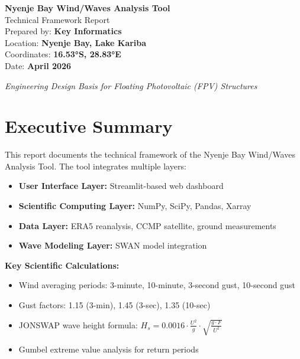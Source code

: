 \documentclass[12pt]{article}
\begin{document}
\begin{titlepage}
    \centering
    \vspace*{2cm}
    
    {\huge\bfseries\color{primary} Nyenje Bay Wind/Waves Analysis Tool}\\[0.5cm]
    {\Large Technical Framework Report}\\[2cm]
    
    {\large Prepared by: \textbf{Key Informatics}}\\[0.3cm]
    {\large Location: \textbf{Nyenje Bay, Lake Kariba}}\\[0.3cm]
    {\large Coordinates: \textbf{16.53°S, 28.83°E}}\\[0.3cm]
    {\large Date: \textbf{April 2026}}\\[2cm]
    
    \vfill
    
    {\large \textit{Engineering Design Basis for Floating Photovoltaic (FPV) Structures}}
\end{titlepage}

\tableofcontents
\newpage

\section*{Executive Summary}

This report documents the technical framework of the Nyenje Bay Wind/Waves Analysis Tool. The tool integrates multiple layers:
\begin{itemize}
    \item \textbf{User Interface Layer:} Streamlit-based web dashboard
    \item \textbf{Scientific Computing Layer:} NumPy, SciPy, Pandas, Xarray
    \item \textbf{Data Layer:} ERA5 reanalysis, CCMP satellite, ground measurements
    \item \textbf{Wave Modeling Layer:} SWAN model integration
\end{itemize}

\vspace{0.5cm}

\textbf{Key Scientific Calculations:}
\begin{itemize}
    \item Wind averaging periods: 3-minute, 10-minute, 3-second gust, 10-second gust
    \item Gust factors: 1.15 (3-min), 1.45 (3-sec), 1.35 (10-sec)
    \item JONSWAP wave height formula: $H_s = 0.0016 \cdot \frac{U^2}{g} \cdot \sqrt{\frac{g \cdot F}{U^2}}$
    \item Gumbel extreme value analysis for return periods
\end{itemize}
\end{document}
